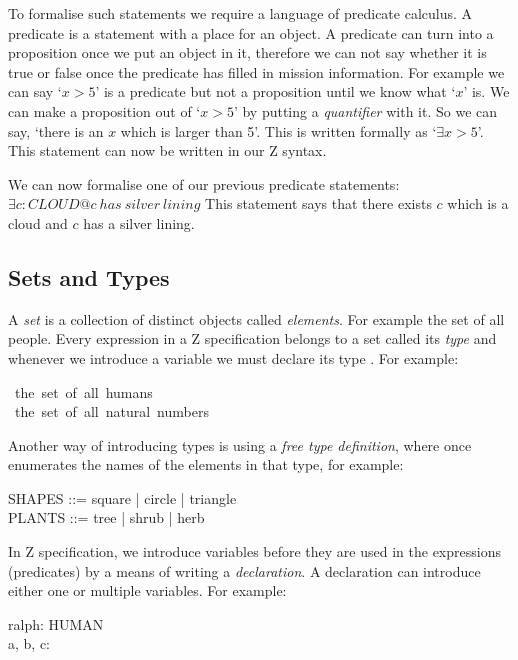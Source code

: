 To formalise such statements we require a language of predicate calculus. A predicate is a statement with a place for an object. A predicate can turn into a proposition once we put an object in it, therefore we can not say whether it is true or false once the predicate has filled in mission information. For example we can say `$x > 5$' is a predicate but not a proposition until we know what `$x$' is. We can make a proposition out of `$x > 5$' by putting a \textit{quantifier} with it. So we can say, `there is an $x$ which is larger than 5'. This is written formally as `$\exists x > 5$'. This statement can now be written in our Z syntax.

We can now formalise one of our previous predicate statements:
\newline
$\exists c: CLOUD @ c\ has\ silver\ lining$
This statement says that there exists $c$ which is a cloud and $c$ has a silver lining.

\subsection{Sets and Types}

A \textit{set} is a collection of distinct objects called \textit{elements}. For example the set of all people. Every expression in a Z specification belongs to a set called its \textit{type} and whenever we introduce a variable we must declare its type \cite{essenceofz}. For example:

\begin{zed}
[HUMAN]\ the\ set\ of\ all\ humans \\
\nat\ the\ set\ of\ all\ natural\ numbers
\end{zed}

Another way of introducing types is using a \textit{free type definition}, where once enumerates the names of the elements in that type, for example:

\begin{zed}
SHAPES ::= square | circle | triangle \\
PLANTS ::= tree | shrub | herb \\
\end{zed}

In Z specification, we introduce variables before they are used in the expressions (predicates) by a means of writing a \textit{declaration}. A declaration can introduce either one or multiple variables. For example:

\begin{zed}
ralph: HUMAN \\
a, b, c: \nat
\end{zed}

